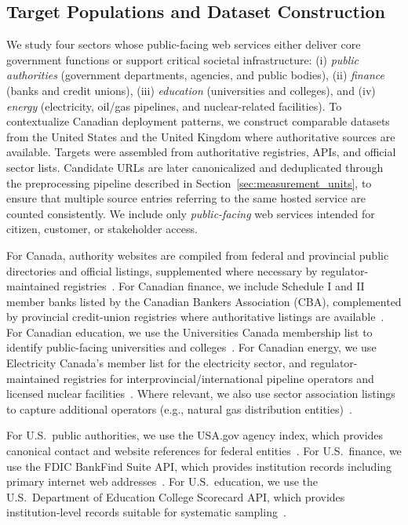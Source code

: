 \documentclass[a4paper,fleqn]{cas-sc}
\begin{document}
\subsection{Target Populations and Dataset Construction}
    We study four sectors whose public-facing web services either deliver core government functions or support critical societal infrastructure: (i) \emph{public authorities} (government departments, agencies, and public bodies), (ii) \emph{finance} (banks and credit unions), (iii) \emph{education} (universities and colleges), and (iv) \emph{energy} (electricity, oil/gas pipelines, and nuclear-related facilities).
    To contextualize Canadian deployment patterns, we construct comparable datasets from the United States and the United Kingdom where authoritative sources are available.
    Targets were assembled from authoritative registries, APIs, and official sector lists.
    Candidate URLs are later canonicalized and deduplicated through the preprocessing pipeline described in Section~\ref{sec:measurement_units}, to ensure that multiple source entries referring to the same hosted service are counted consistently.
    We include only \emph{public-facing} web services intended for citizen, customer, or stakeholder access.
    
    For Canada, authority websites are compiled from federal and provincial public directories and official listings, supplemented where necessary by regulator-maintained registries~\cite{canada_depts,canada_institutions,crown_corps,ca_airports,maritime_ports,ca_emergency_management}.
    For Canadian finance, we include Schedule I and II member banks listed by the Canadian Bankers Association (CBA), complemented by provincial credit-union registries where authoritative listings are available~\cite{cba_member_banks_2024}.
    For Canadian education, we use the Universities Canada membership list to identify public-facing universities and colleges~\cite{ca_unis_list}.
    For Canadian energy, we use Electricity Canada’s member list for the electricity sector, and regulator-maintained registries for interprovincial/international pipeline operators and licensed nuclear facilities~\cite{electric_canada_members,cer_pipeline_companies,cnsc_nuclear_facilities}.
    Where relevant, we also use sector association listings to capture additional operators (e.g., natural gas distribution entities)~\cite{cga_industry_links}.
    
    For U.S.\ public authorities, we use the USA.gov agency index, which provides canonical contact and website references for federal entities~\cite{usa-agency-index}.
    For U.S.\ finance, we use the FDIC BankFind Suite API, which provides institution records including primary internet web addresses~\cite{fdic-bankfind-api}.
    For U.S.\ education, we use the U.S.\ Department of Education College Scorecard API, which provides institution-level records suitable for systematic sampling~\cite{us-college-scorecard-docs}.
    
\end{document}
